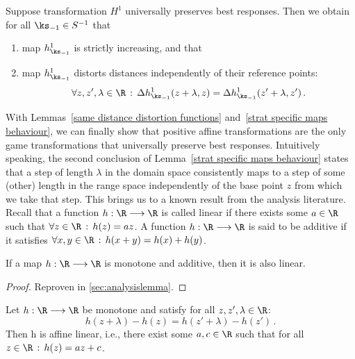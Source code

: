 \begin{lemma}
\label{strat specific maps behaviour}
Suppose transformation $H^1$ universally preserves best responses. Then we obtain for all $\ks_{-1} \in S^{-1}$ that
\begin{enumerate}
\item map $h_{\ks_{-1}}^1$ is strictly increasing, and that
\item map $h_{\ks_{-1}}^1$ distorts distances independently of their reference points:
\begin{align*}
\forall z,z',\lambda \in \R \, : \, \Delta h_{\ks_{-1}}^1(z + \lambda, z) = \Delta h_{\ks_{-1}}^1(z' + \lambda, z') \, .
\end{align*}
\end{enumerate}
\end{lemma}

With Lemmas~\ref{same distance distortion functions} and~\ref{strat specific maps behaviour}, we can finally show that positive affine transformations are the only game transformations that universally preserve best responses. Intuitively speaking, the second conclusion of Lemma~\ref{strat specific maps behaviour} states that a step of length $\lambda$ in the domain space consistently maps to a step of some (other) length in the range space independently of the base point $z$ from which we take that step. This brings us to a known result from the analysis literature. Recall that a function $h: \R \longrightarrow \R$ is called linear if there exists some $a \in \R$ such that $\forall z \in \R \, : \, h(z) = az$. A function $h: \R \longrightarrow \R$ is said to be additive if it satisfies $\forall x,y \in \R \, : \, h(x+y) = h(x) + h(y)$.
\begin{lemma}
\label{helping analysis lemma}
If a map $h: \R \longrightarrow \R$ is monotone and additive, then it is also linear.
\end{lemma}
\begin{proof}
Reproven in \ref{sec:analysislemma}.
\end{proof}
\begin{cor}
\label{affine linearity corollary}
Let $h: \R \longrightarrow \R$ be monotone and satisfy for all $z,z',\lambda \in \R$:
\begin{equation*}
h(z+\lambda) - h(z) = h(z' + \lambda) - h(z') \, .
\end{equation*} 
Then h is affine linear, i.e., there exist some $a,c \in \R$ such that for all $z \in \R\, : \, h(z) = az + c$.
\end{cor}

